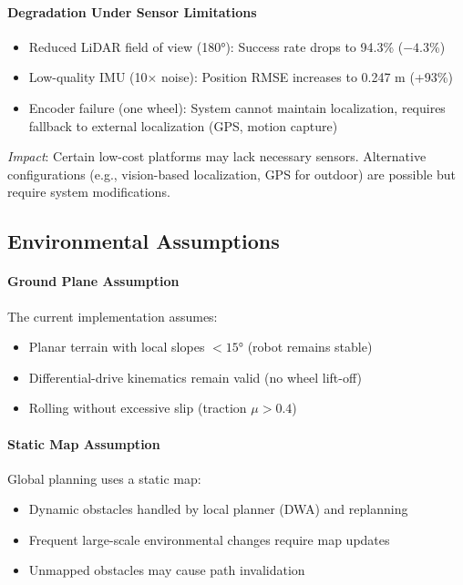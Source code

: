 \paragraph{Degradation Under Sensor Limitations}
\begin{itemize}
    \item Reduced LiDAR field of view (180°): Success rate drops to 94.3\% ($-4.3$\%)
    \item Low-quality IMU (10$\times$ noise): Position RMSE increases to 0.247 m (+93\%)
    \item Encoder failure (one wheel): System cannot maintain localization, requires fallback to external localization (GPS, motion capture)
\end{itemize}

\textit{Impact}: Certain low-cost platforms may lack necessary sensors. Alternative configurations (e.g., vision-based localization, GPS for outdoor) are possible but require system modifications.

\subsection{Environmental Assumptions}

\paragraph{Ground Plane Assumption}
The current implementation assumes:
\begin{itemize}
    \item Planar terrain with local slopes $< 15°$ (robot remains stable)
    \item Differential-drive kinematics remain valid (no wheel lift-off)
    \item Rolling without excessive slip (traction $\mu > 0.4$)
\end{itemize}

\paragraph{Static Map Assumption}
Global planning uses a static map:
\begin{itemize}
    \item Dynamic obstacles handled by local planner (DWA) and replanning
    \item Frequent large-scale environmental changes require map updates
    \item Unmapped obstacles may cause path invalidation
\end{itemize}

